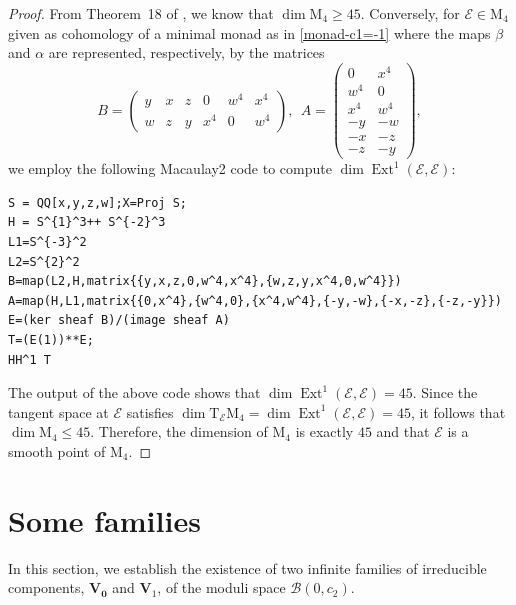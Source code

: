 \documentclass[twoside,reqno]{amsart}
\theoremstyle{plain}
\DeclareMathOperator{\Ext}{Ext}
\newcommand{\E}{\mathcal{E}}
\begin{document}
\begin{proof}
From Theorem~18 of \cite{MF2021}, we know that $\dim \mathrm{M}_4\geq45$. Conversely, for $\E\in \mathrm{M}_4$ given as cohomology of 
a minimal monad as in \eqref{monad-c1=-1} where the maps 
$\beta$ and $\alpha$ are represented, respectively, by the matrices
$$B=\begin{pmatrix}
  y & x & z & 0 & w^{4} & x^{4} \\
  w & z & y & x^{4} & 0 & w^{4}
\end{pmatrix},
~~A=\begin{pmatrix}
  0 & x^{4} \\
  w^{4} & 0 \\
  x^{4} & w^{4} \\
  -y & -w \\
  -x & -z \\
  -z & -y
\end{pmatrix},$$
we employ the following Macaulay2 code to compute $\dim\operatorname{Ext}^1(\E,\E)$:
\begin{lstlisting}[language=Macaulay2]
S = QQ[x,y,z,w];X=Proj S;
H = S^{1}^3++ S^{-2}^3
L1=S^{-3}^2
L2=S^{2}^2
B=map(L2,H,matrix{{y,x,z,0,w^4,x^4},{w,z,y,x^4,0,w^4}})
A=map(H,L1,matrix{{0,x^4},{w^4,0},{x^4,w^4},{-y,-w},{-x,-z},{-z,-y}})
E=(ker sheaf B)/(image sheaf A)
T=(E(1))**E;
HH^1 T
\end{lstlisting}
The output of the above code shows that $\dim\Ext^1(\E,\E)=45$. Since the tangent space at $\E$ satisfies 
$\dim\mathrm{T}_{\E}\mathrm{M}_4 = \dim\Ext^1(\E,\E)=45$, 
it follows that $\dim\mathrm{M}_4\leq45$. Therefore, the dimension of $\mathrm{M}_4$ is exactly $45$ and that $\E$ is a 
smooth point of $\mathrm{M}_4$.
\end{proof}


\section{Some families}\label{section-families}
In this section, we establish the existence of two infinite families of irreducible components, $\mathbf{V_0}$ and 
$\mathbf{V}_1$, of the moduli space $\mathcal{B}(0,c_2).$
\end{document}
